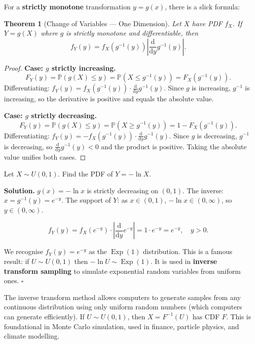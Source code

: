 \documentclass[12pt, a4paper, oneside]{book}
\theoremstyle{definition}
\theoremstyle{plain}
\newtheorem{theorem}{Theorem}[section]
\theoremstyle{remark}
\newcommand{\Prob}{\mathbb{P}}
\newenvironment{solution}
  {\par\medskip\noindent\textbf{Solution.}\quad}
  {\hfill$\square$\par\medskip}
\begin{document}
For a \textbf{strictly monotone} transformation $y = g(x)$, there is a
slick formula:

\begin{theorem}[Change of Variables --- One Dimension]
Let $X$ have PDF $f_X$.  If $Y = g(X)$ where $g$ is strictly monotone and
differentiable, then
\[
  f_Y(y) = f_X\!\left(g^{-1}(y)\right)\left|\frac{\mathrm{d}}{\mathrm{d}y}g^{-1}(y)\right|.
\]
\end{theorem}

\begin{proof}
\textbf{Case: $g$ strictly increasing.}
\[
  F_Y(y) = \Prob(g(X)\le y) = \Prob\!\left(X\le g^{-1}(y)\right) = F_X\!\left(g^{-1}(y)\right).
\]
Differentiating: $f_Y(y) = f_X(g^{-1}(y))\cdot\frac{\mathrm{d}}{\mathrm{d}y}g^{-1}(y)$.
Since $g$ is increasing, $g^{-1}$ is increasing, so the derivative is
positive and equals the absolute value.

\textbf{Case: $g$ strictly decreasing.}
\[
  F_Y(y) = \Prob(g(X)\le y) = \Prob\!\left(X\ge g^{-1}(y)\right)
  = 1 - F_X\!\left(g^{-1}(y)\right).
\]
Differentiating: $f_Y(y) = -f_X(g^{-1}(y))\cdot\frac{\mathrm{d}}{\mathrm{d}y}g^{-1}(y)$.
Since $g$ is decreasing, $g^{-1}$ is decreasing, so $\frac{\mathrm{d}}{\mathrm{d}y}g^{-1}(y)<0$
and the product is positive.  Taking the absolute value unifies both cases.
\end{proof}

\begin{workedexample}
Let $X \sim U(0,1)$.  Find the PDF of $Y = -\ln X$.

\begin{solution}
$g(x) = -\ln x$ is strictly decreasing on $(0,1)$.
The inverse: $x = g^{-1}(y) = e^{-y}$.
The support of $Y$: as $x\in(0,1)$, $-\ln x \in (0,\infty)$, so $y\in(0,\infty)$.

\[
  f_Y(y) = f_X(e^{-y})\cdot\left|\frac{\mathrm{d}}{\mathrm{d}y}e^{-y}\right|
  = 1 \cdot e^{-y} = e^{-y}, \quad y > 0.
\]

We recognise $f_Y(y) = e^{-y}$ as the $\operatorname{Exp}(1)$ distribution.
This is a famous result: if $U\sim U(0,1)$ then $-\ln U \sim \operatorname{Exp}(1)$.
It is used in \textbf{inverse transform sampling} to simulate exponential random
variables from uniform ones.
\end{solution}
\end{workedexample}

\begin{realworld}[: Simulation]
The inverse transform method allows computers to generate samples from any
continuous distribution using only uniform random numbers (which computers
can generate efficiently).  If $U\sim U(0,1)$, then $X = F^{-1}(U)$ has CDF
$F$.  This is foundational in Monte Carlo simulation, used in finance,
particle physics, and climate modelling.
\end{realworld}
\end{document}
